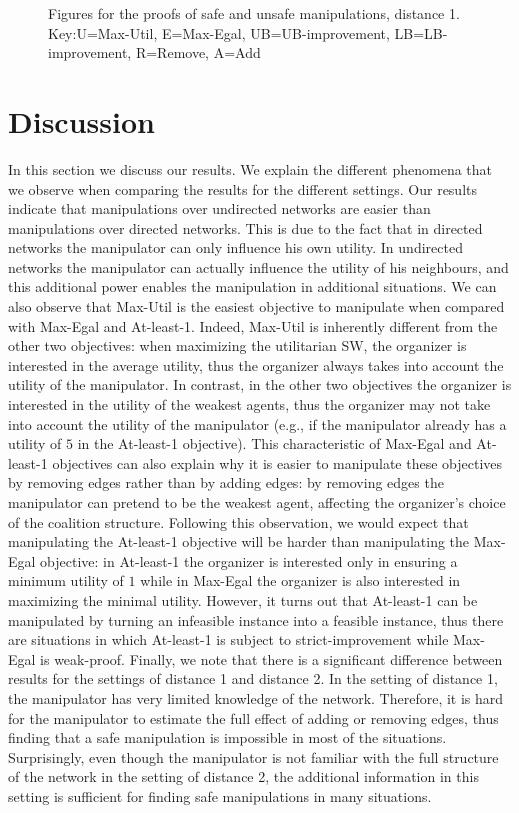\documentclass{article}
\begin{document}
\begin{figure}[t]
    \caption{Figures for the proofs of safe and unsafe manipulations, distance 1. Key:U=Max-Util, E=Max-Egal, UB=UB-improvement, LB=LB-improvement, R=Remove, A=Add}
    \label{fig:distance1_graphs}
\end{figure}


\section{Discussion}
In this section we discuss our results. We explain the different phenomena that we observe when comparing the results for the different settings.
Our results indicate that manipulations over undirected networks are easier than manipulations over directed networks. This is due to the fact that in directed networks the manipulator can only influence his own utility. In undirected networks the manipulator can actually influence the utility of his neighbours, and this additional power enables the manipulation in additional situations.
We can also observe that Max-Util is the easiest objective to manipulate when compared with Max-Egal and At-least-1. Indeed, Max-Util is inherently different from the other two objectives: when maximizing the utilitarian SW, the organizer is interested in the average utility, thus the organizer always takes into account the utility of the manipulator. In contrast, in the other two objectives the organizer is interested in the utility of the weakest agents, thus the organizer may not take into account the utility of the manipulator (e.g., if the manipulator already has a utility of $5$ in the At-least-1 objective). 
This characteristic of Max-Egal and At-least-1 objectives can also explain why it is easier to manipulate these objectives by removing edges rather than by adding edges: by removing edges the manipulator can pretend to be the weakest agent, affecting the organizer's choice of the coalition structure. Following this observation, we would expect that manipulating the At-least-1 objective will be harder than manipulating the Max-Egal objective: in At-least-1 the organizer is interested only in ensuring a minimum utility of $1$ while in Max-Egal the organizer is also interested in maximizing the minimal utility. However, it turns out that At-least-1 can be manipulated by turning an infeasible instance into a feasible instance, thus there are situations in which At-least-1 is subject to strict-improvement while Max-Egal is weak-proof.
Finally, we note that there is a significant difference between results for the settings of distance 1 and distance 2. In the setting of distance 1, the manipulator has very limited knowledge of the network. Therefore, it is hard for the manipulator to estimate the full effect of adding or removing edges, thus finding that a safe manipulation is impossible in most of the situations. Surprisingly, even though the manipulator is not familiar with the full structure of the network in the setting of distance 2, the additional information in this setting is sufficient for finding safe manipulations in many situations.
\end{document}
